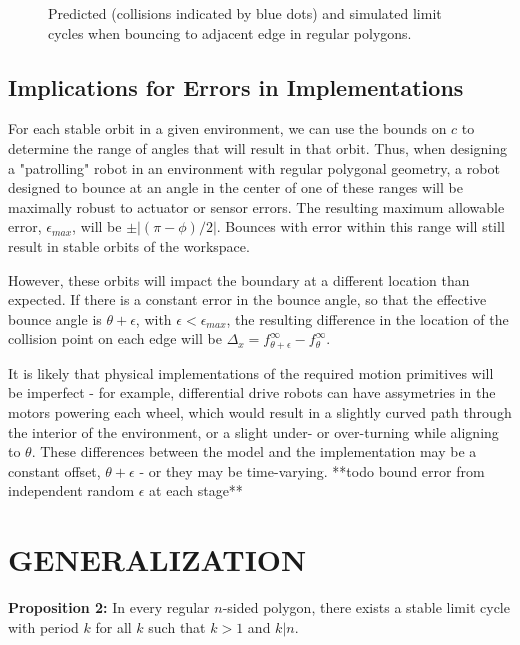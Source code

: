 \documentclass[letterpaper, 10 pt, conference]{ieeeconf}  %
\begin{document}
\begin{figure}
\begin{subfigure}{0.25\textwidth}
\end{subfigure}

\caption{Predicted (collisions indicated by blue dots) and simulated limit cycles when bouncing to adjacent edge in
regular polygons. \label{prediction}}
\end{figure}

\subsection{Implications for Errors in Implementations}

For each stable orbit in a given environment, we can use the bounds on
$c$ to determine the range of angles that will result in that orbit. 
Thus,
when designing a "patrolling" robot in an environment with regular polygonal
geometry, a robot designed to bounce at an angle in the center of one of these
ranges will be maximally robust to actuator or sensor errors. The resulting
maximum allowable error, $\epsilon_{max}$, will be $\pm | (\pi - \phi)/2 |$.
Bounces with error within this range will still result in stable orbits of the
workspace.

However, these orbits will impact the boundary at
a different location than expected. If there is a constant error in the bounce
angle, so that the effective bounce angle is $\theta + \epsilon$, with $\epsilon
< \epsilon_{max}$, the resulting difference in the location of the collision point
on each edge will be $\Delta_x = f_{\theta + \epsilon}^{\infty} - f_{\theta}^{\infty}$.

It is likely that physical implementations of the required motion primitives
will be imperfect - for example, differential drive robots can have assymetries
in the motors powering each wheel, which would result in a slightly curved path
through the interior of the environment, or a slight under- or over-turning
while aligning to $\theta$. These differences between the model and the
implementation may be a constant offset, $\theta + \epsilon$ - or
they may be time-varying. **todo bound error from independent random $\epsilon$
at each stage**

\section{GENERALIZATION}

\textbf{Proposition 2:} In every regular $n$-sided polygon, there exists a stable limit
cycle with period $k$ for all $k$ such that $k > 1$ and $k|n$.
\end{document}
